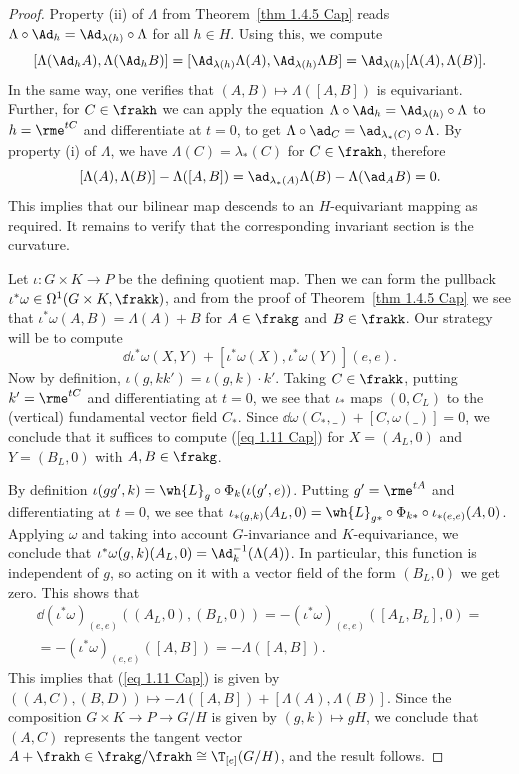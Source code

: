 \begin{proof}
    Property (ii) of $\Lambda$ from Theorem~\ref{thm 1.4.5 Cap} reads $\Lambda\circ\Ad_h=\Ad_{\lambda(h)}\circ\Lambda$ for all $h\in H$. Using this, we compute 
    \[[\Lambda(\Ad_h A),\Lambda(\Ad_h B)]=[\Ad_{\lambda(h)}\Lambda(A),\Ad_{\lambda(h)}\Lambda B]=\Ad_{\lambda(h)}[\Lambda(A),\Lambda(B)].\]
    In the same way, one verifies that $(A,B)\mapsto \Lambda([A,B])$ is equivariant. Further, for $C\in\frakh$ we can apply the equation $\Lambda\circ \Ad_h=\Ad_{\lambda(h)}\circ \Lambda$ to $h=\rme^{tC}$ and differentiate at $t=0$, to get $\Lambda\circ\ad_C=\ad_{\lambda_\ast(C)}\circ\Lambda$. By property (i) of $\Lambda$, we have $\Lambda(C)=\lambda_\ast(C)$ for $C\in\frakh$, therefore 
    \[[\Lambda(A),\Lambda(B)]-\Lambda([A,B])=\ad_{\lambda_\ast(A)}\Lambda(B)-\Lambda(\ad_A B)=0.\]
    This implies that our bilinear map descends to an $H$-equivariant mapping as required. It remains to verify that the corresponding invariant section is the curvature.

    Let $\iota:G\times K\to P$ be the defining quotient map. Then we can form the pullback $\iota^\ast\omega\in\Omega^1(G\times K,\frakk)$, and from the proof of Theorem~\ref{thm 1.4.5 Cap} we see that $\iota^\ast\omega(A,B)=\Lambda(A)+B$ for $A\in\frakg$ and $B\in\frakk$. Our strategy will be to compute 
    \[\dd\iota^\ast\omega(X,Y)+[\iota^\ast\omega(X),\iota^\ast\omega(Y)](e,e).\label{eq 1.11 Cap}\]
    Now by definition, $\iota(g,kk')=\iota(g,k)\cdot k'$. Taking $C\in\frakk$, putting $k'=\rme^{tC}$ and differentiating at $t=0$, we see that $\iota_\ast$ maps $(0,C_L)$ to the (vertical) fundamental vector field $C_\ast$. Since $\dd\omega(C_\ast,\_)+[C,\omega(\_)]=0$, we conclude that it suffices to compute (\ref{eq 1.11 Cap}) for $X=(A_L,0)$ and $Y=(B_L,0)$ with $A,B\in\frakg$.

    By definition $\iota(gg',k)=\wh{L}_g\circ \Phi_k(\iota(g',e))$. Putting $g'=\rme^{tA}$ and differentiating at $t=0$, we see that $\iota_{\ast(g,k)}(A_L,0)=\wh{L}_{g\ast}\circ \Phi_{k\ast}\circ \iota_{\ast(e,e)}(A,0)$. Applying $\omega$ and taking into account $G$-invariance and $K$-equivariance, we conclude that $\iota^\ast\omega(g,k)(A_L,0)=\Ad_k^{-1}(\Lambda(A))$. In particular, this function is independent of $g$, so acting on it with a vector field of the form $(B_L,0)$ we get zero. This shows that
    \begin{multline}
        \dd(\iota^\ast\omega)_{(e,e)}((A_L,0),(B_L,0))=-(\iota^\ast\omega)_{(e,e)}([A_L,B_L],0)=\\
        =-(\iota^\ast \omega)_{(e,e)}([A,B])=-\Lambda([A,B]).
    \end{multline}
    This implies that (\ref{eq 1.11 Cap}) is given by $((A,C),(B,D))\mapsto -\Lambda([A,B])+[\Lambda(A),\Lambda(B)]$. Since the composition $G\times K\to P\to G\slash H$ is given by $(g,k)\mapsto gH$, we conclude that $(A,C)$ represents the tangent vector $A+\frakh\in\frakg\slash\frakh\cong \T_{[e]}(G\slash H)$, and the result follows.
\end{proof}

